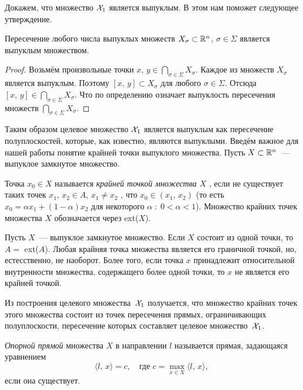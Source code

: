 Докажем, что множество $\mathcal{X}_1$ является выпуклым. В этом нам поможет следующее утверждение.
\begin{assertion}
        Пересечение любого числа выпуклых множеств $X_\sigma \subset \mathbb{R}^n$, $\sigma \in \Sigma$ является выпуклым множеством.
\end{assertion}
\begin{proof}
        Возьмём произвольные точки $x,\,y \in \bigcap\limits_{\sigma \in \Sigma} X_\sigma$. Каждое из множеств $X_\sigma$ является выпуклым. Поэтому $[x,\,y] \subset X_\sigma$ для любого $\sigma \in \Sigma$. Отсюда $[x,\,y] \in \bigcap\limits_{\sigma \in \Sigma} X_\sigma$. Что по определению означает выпуклость пересечения множеств $\bigcap\limits_{\sigma \in \Sigma} X_\sigma$.

\end{proof} 

Таким образом целевое множество $\mathcal{X}_1$ является выпуклым как пересечение полуплоскостей, которые, как известно, являются выпуклыми.
Введём важное для нашей работы понятие крайней точки выпуклого множества. Пусть $X \subset \mathbb{R}^n$~--- выпуклое замкнутое множество.
\begin{definition}
        Точка $x_0 \in X$ называется \textit{крайней точкой множества $X$} , если не существует таких точек $x_1,\,x_2 \in A$, $x_1 \neq x_2$ , что $x_0 \in (x_1,\,x_2)$ (то есть $x_0 = \alpha x_1 + (1-\alpha)x_2$ для некоторого $\alpha\;:\; 0 < \alpha < 1$). Множество крайних точек множества $X$ обозначается через ext($X$).
\end{definition}

Пусть $X$~--- выпуклое замкнутое множество. Если $X$ состоит из одной точки, то $A =$ ext($A$). Любая крайняя точка множества является его граничной точкой, но, естесственно, не наоборот. Более того, если точка $x$ принадлежит относительной внутренности множества, содержащего более одной точки, то $x$ не является его крайней точкой.

Из построения целевого множества~$\mathcal{X}_1$ получается, что множество крайних точек этого множества состоит из точек пересечения прямых, ограничивающих полуплоскости, пересечение которых составляет целевое множество~$\mathcal{X}_1$.
\begin{definition}
    \textit{Опорной прямой} множества $X$ в направлении $l$ называется прямая, задающаяся уравнением 
    $$
        \langle l,\,x\rangle = c, \quad \mbox{где } c = \max\limits_{x \in X}\langle l,\,x\rangle,
    $$ если она существует.
\end{definition}

